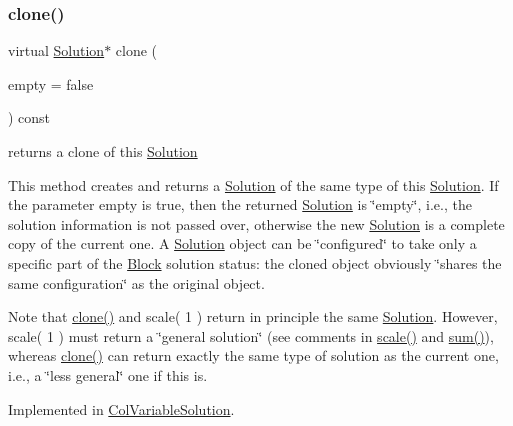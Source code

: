 \subsubsection{\texorpdfstring{clone()}{clone()}}
{\footnotesize\ttfamily virtual \mbox{\hyperlink{class_s_m_spp__di__unipi__it_1_1_solution}{Solution}}$\ast$ clone (\begin{DoxyParamCaption}\item[{bool}]{empty = {\ttfamily false} }\end{DoxyParamCaption}) const\hspace{0.3cm}{\ttfamily [pure virtual]}}



returns a clone of this \mbox{\hyperlink{class_s_m_spp__di__unipi__it_1_1_solution}{Solution}} 

This method creates and returns a \mbox{\hyperlink{class_s_m_spp__di__unipi__it_1_1_solution}{Solution}} of the same type of this \mbox{\hyperlink{class_s_m_spp__di__unipi__it_1_1_solution}{Solution}}. If the parameter empty is true, then the returned \mbox{\hyperlink{class_s_m_spp__di__unipi__it_1_1_solution}{Solution}} is \char`\"{}empty\char`\"{}, i.\+e., the solution information is not passed over, otherwise the new \mbox{\hyperlink{class_s_m_spp__di__unipi__it_1_1_solution}{Solution}} is a complete copy of the current one. A \mbox{\hyperlink{class_s_m_spp__di__unipi__it_1_1_solution}{Solution}} object can be \char`\"{}configured\char`\"{} to take only a specific part of the \mbox{\hyperlink{class_s_m_spp__di__unipi__it_1_1_block}{Block}} solution status\+: the cloned object obviously \char`\"{}shares the same configuration\char`\"{} as the original object.

Note that \mbox{\hyperlink{class_s_m_spp__di__unipi__it_1_1_solution_a02ecf9046100701d7bcc800deaa5717b}{clone()}} and scale( 1 ) return in principle the same \mbox{\hyperlink{class_s_m_spp__di__unipi__it_1_1_solution}{Solution}}. However, scale( 1 ) must return a \char`\"{}general solution\char`\"{} (see comments in \mbox{\hyperlink{class_s_m_spp__di__unipi__it_1_1_solution_abf1a2d1763f128a72b2677d4b9ff4d3b}{scale()}} and \mbox{\hyperlink{class_s_m_spp__di__unipi__it_1_1_solution_adc2450947fd142657637bf79d91505a9}{sum()}}), whereas \mbox{\hyperlink{class_s_m_spp__di__unipi__it_1_1_solution_a02ecf9046100701d7bcc800deaa5717b}{clone()}} can return exactly the same type of solution as the current one, i.\+e., a \char`\"{}less general\char`\"{} one if this is. 

Implemented in \mbox{\hyperlink{class_s_m_spp__di__unipi__it_1_1_col_variable_solution_a3088fd7540cc9da5a5539a4c9deea8ea}{Col\+Variable\+Solution}}.

